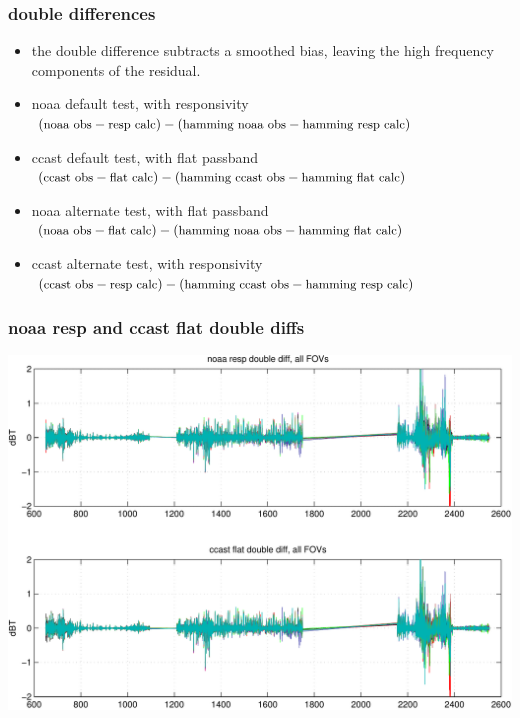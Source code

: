 \documentclass[11pt]{beamer}
\begin{document}
\begin{frame}
\frametitle{double differences}

\begin{itemize}

  \item the double difference subtracts a smoothed bias, leaving the
    high frequency components of the residual.

  \vspace{3mm}
  \item noaa default test, with responsivity \\
    $(\mbox{\small noaa obs} - \mbox{\small resp calc}) - 
       (\mbox{\small hamming noaa obs} - 
        \mbox{\small hamming resp calc})$

  \item ccast default test, with flat passband \\
    $(\mbox{\small ccast obs} - \mbox{\small flat calc}) - 
       (\mbox{\small hamming ccast obs} - 
        \mbox{\small hamming flat calc})$

  \item noaa alternate test, with flat passband \\
    $(\mbox{\small noaa obs} - \mbox{\small flat calc}) - 
       (\mbox{\small hamming noaa obs} - 
        \mbox{\small hamming flat calc})$  

  \item ccast alternate test, with responsivity \\
    $(\mbox{\small ccast obs} - \mbox{\small resp calc}) - 
       (\mbox{\small hamming ccast obs} - 
        \mbox{\small hamming resp calc})$

\end{itemize}

\end{frame}
\begin{frame}
\frametitle{noaa resp and ccast flat double diffs}
\begin{center}
  \includegraphics[scale=0.5]{figures/cal_ddif_1.pdf}
\end{center}
\end{frame}
\end{document}
